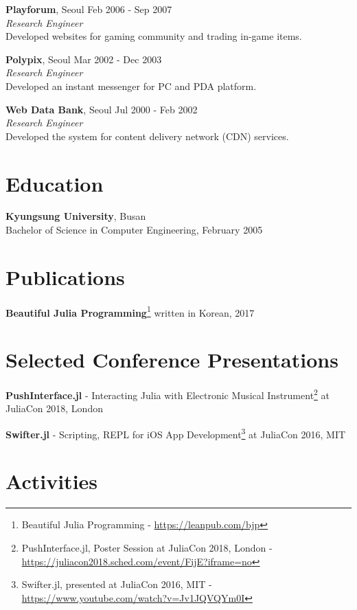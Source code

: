 \documentclass[margin,line]{res}
\begin{document}
\begin{resume}
{\bf Playforum}, Seoul \hfill Feb 2006 - Sep 2007 \\
{\em Research Engineer} \\
Developed websites for gaming community and trading in-game items.

{\bf Polypix}, Seoul \hfill Mar 2002 - Dec 2003 \\
{\em Research Engineer} \\
Developed an instant messenger for PC and PDA platform.

{\bf Web Data Bank}, Seoul \hfill Jul 2000 - Feb 2002 \\
{\em Research Engineer} \\
Developed the system for content delivery network (CDN) services.


\section{\sc Education}
{\bf Kyungsung University}, Busan \\
Bachelor of Science in Computer Engineering, February 2005


\section{\sc Publications}
{\bf Beautiful Julia Programming}\footnote{ Beautiful Julia Programming - \url{https://leanpub.com/bjp}} written in Korean, 2017


\section{\sc Selected Conference Presentations}
{\bf PushInterface.jl} - Interacting Julia with Electronic Musical Instrument\footnote{ PushInterface.jl, Poster Session at JuliaCon 2018, London - \url{https://juliacon2018.sched.com/event/FijE?iframe=no}} at JuliaCon 2018, London \hfill

{\bf Swifter.jl} - Scripting, REPL for iOS App Development\footnote{ Swifter.jl, presented at JuliaCon 2016, MIT - \url{https://www.youtube.com/watch?v=Jv1JQVQYm0I}} at JuliaCon 2016, MIT \hfill

\vspace{1.5cm}

\section{\sc Activities}

\vspace{-0.1cm}


\end{resume}
\end{document}
